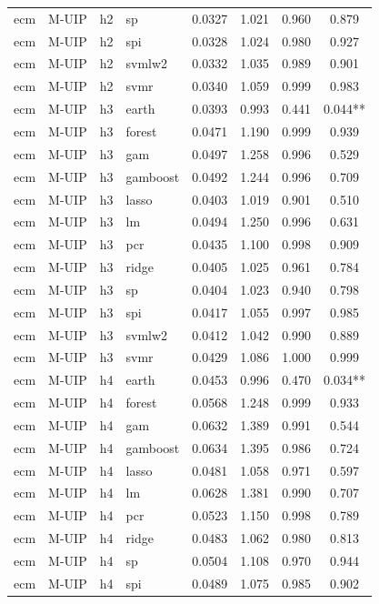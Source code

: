 \begin{ThreePartTable}
\begin{longtable}[t]{llclcccc}
ecm & M-UIP & h2 & sp & 0.0327 & 1.021 & 0.960 & 0.879\\
ecm & M-UIP & h2 & spi & 0.0328 & 1.024 & 0.980 & 0.927\\
ecm & M-UIP & h2 & svmlw2 & 0.0332 & 1.035 & 0.989 & 0.901\\
ecm & M-UIP & h2 & svmr & 0.0340 & 1.059 & 0.999 & 0.983\\
\addlinespace
ecm & M-UIP & h3 & earth & 0.0393 & 0.993 & 0.441 & 0.044**\\
ecm & M-UIP & h3 & forest & 0.0471 & 1.190 & 0.999 & 0.939\\
ecm & M-UIP & h3 & gam & 0.0497 & 1.258 & 0.996 & 0.529\\
ecm & M-UIP & h3 & gamboost & 0.0492 & 1.244 & 0.996 & 0.709\\
ecm & M-UIP & h3 & lasso & 0.0403 & 1.019 & 0.901 & 0.510\\
ecm & M-UIP & h3 & lm & 0.0494 & 1.250 & 0.996 & 0.631\\
ecm & M-UIP & h3 & pcr & 0.0435 & 1.100 & 0.998 & 0.909\\
ecm & M-UIP & h3 & ridge & 0.0405 & 1.025 & 0.961 & 0.784\\
ecm & M-UIP & h3 & sp & 0.0404 & 1.023 & 0.940 & 0.798\\
ecm & M-UIP & h3 & spi & 0.0417 & 1.055 & 0.997 & 0.985\\
ecm & M-UIP & h3 & svmlw2 & 0.0412 & 1.042 & 0.990 & 0.889\\
ecm & M-UIP & h3 & svmr & 0.0429 & 1.086 & 1.000 & 0.999\\
\addlinespace
ecm & M-UIP & h4 & earth & 0.0453 & 0.996 & 0.470 & 0.034**\\
ecm & M-UIP & h4 & forest & 0.0568 & 1.248 & 0.999 & 0.933\\
ecm & M-UIP & h4 & gam & 0.0632 & 1.389 & 0.991 & 0.544\\
ecm & M-UIP & h4 & gamboost & 0.0634 & 1.395 & 0.986 & 0.724\\
ecm & M-UIP & h4 & lasso & 0.0481 & 1.058 & 0.971 & 0.597\\
ecm & M-UIP & h4 & lm & 0.0628 & 1.381 & 0.990 & 0.707\\
ecm & M-UIP & h4 & pcr & 0.0523 & 1.150 & 0.998 & 0.789\\
ecm & M-UIP & h4 & ridge & 0.0483 & 1.062 & 0.980 & 0.813\\
ecm & M-UIP & h4 & sp & 0.0504 & 1.108 & 0.970 & 0.944\\
ecm & M-UIP & h4 & spi & 0.0489 & 1.075 & 0.985 & 0.902\\

\end{longtable}
\end{ThreePartTable}
